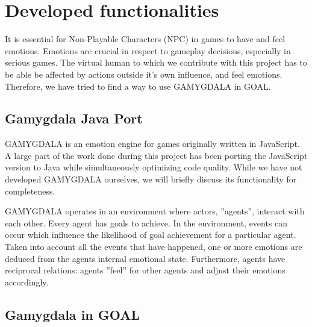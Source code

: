 \section{Developed functionalities}
It is essential for Non-Playable Characters (NPC) in games to have and feel emotions. Emotions are crucial in respect to gameplay decisions, especially in serious games. The virtual human to which we contribute with this project has to be able be affected by actions outside it's own influence, and feel emotions. Therefore, we have tried to find a way to use GAMYGDALA \citep{gamygdala} in GOAL.

\subsection{Gamygdala Java Port}
GAMYGDALA is an emotion engine for games originally written in JavaScript. A large part of the work done during this project has been porting the JavaScript version to Java while simultaneously optimizing code quality. While we have not developed GAMYGDALA ourselves, we will briefly discuss its functionality for completeness.

GAMYGDALA operates in an environment where actors, ''agents'', interact with each other. Every agent has goals to achieve. In the environment, events can occur which influence the likelihood of goal achievement for a particular agent. Taken into account all the events that have happened, one or more emotions are deduced from the agents internal emotional state. Furthermore, agents have reciprocal relations: agents ''feel'' for other agents and adjust their emotions accordingly.

\subsection{Gamygdala in GOAL}
